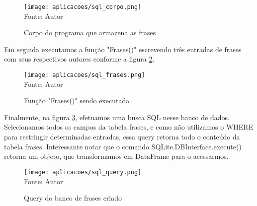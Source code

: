 %
\begin{figure}[H]
   \begin{center}
       \caption{Corpo do programa que armazena as frases} \label{sql_corpo}
       \texttt{[image: aplicacoes/sql\_corpo.png]} \\
       {\tiny \sf Fonte: Autor}
   \end{center}
\end{figure}
Em seguida executamos a função "Frases()" escrevendo três entradas de frases com seus respectivos autores conforme a figura \ref{sql_frases}. 
\begin{figure}[H]
    \begin{center}
        \caption{Função "Frases()" sendo executada} \label{sql_frases}
        \texttt{[image: aplicacoes/sql\_frases.png]} \\
        {\tiny \sf Fonte: Autor}
    \end{center}
\end{figure}
Finalmente, na figura \ref{sql_query}, efetuamos uma busca SQL nesse banco de dados. Selecionamos todos os campos da tabela frases, e como não utilizamos o WHERE para restringir determinadas entradas, essa query retorna todo o conteúdo da tabela frases. 
Interessante notar que o comando SQLite.DBInterface.execute() retorna um objeto, que transformamos em DataFrame para o acessarmos. 

\begin{figure}[H]
   \begin{center}
       \caption{Query do banco de frases criado} \label{sql_query}
       \texttt{[image: aplicacoes/sql\_query.png]} \\
       {\tiny \sf Fonte: Autor}
   \end{center}
\end{figure}








